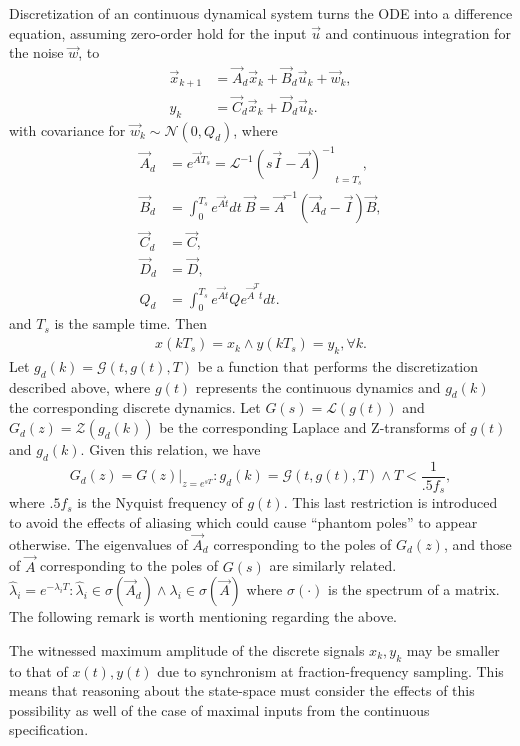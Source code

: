 \documentclass[runningheads,a4paper]{llncs}
\begin{document}
Discretization of an continuous dynamical system turns the ODE into a difference equation, assuming zero-order hold
for the input $\vec{u}$ and continuous integration for the noise $\vec{w}$, to
\begin{align}
\label{eq:discretization}
\vec{x}_{k+1} &= \vec{A}_d\vec{x}_k+\vec{B}_d\vec{u}_k + \vec{w}_k,\\
y_k &= \vec{C}_d \vec{x}_ k + \vec{D}_d \vec{u}_ k. 
\end{align}
with covariance for $\vec{w}_k \sim \mathcal{N}(0,Q_d)$,
where
\begin{align}
\label{eq:discretize}
\vec{A}_d &= e^{\vec{A} T_s} = \mathcal{L}^{-1} { ( s \vec{I} - \vec{A} )^{-1} }_{t = T_s},\\
\vec{B}_d &= \int_{0}^{T_s} e^{\vec{A} t} dt\ \vec{B} = \vec{A}^{-1} ( \vec{A}_d - \vec{I} ) \vec{B},\\
\vec{C}_d &= \vec{C},\\
\vec{D}_d &= \vec{D},\\
Q_d &= \int_{0}^{T_s} e^{\vec{A} t} Q e^{\vec{A}^T t} dt.
\end{align}
and $T_s$ is the sample time. Then
\begin{align*}
x(kT_s)=x_k \wedge y(kT_s) = y_k, \forall k.
\end{align*}
Let $g_d(k)=\mathcal{G}(t,g(t),T)$ be a function that performs the discretization described above, where $g(t)$
represents the continuous dynamics and $g_d(k)$ the corresponding discrete dynamics. 
Let $G(s)=\mathcal{L}(g(t))$ and $G_d(z)=\mathcal{Z}(g_d(k))$ be the corresponding Laplace and Z-transforms
of $g(t)$ and $g_d(k)$. Given this relation, we have 
$$G_d(z)=G(z)|_{z=e^{sT}} : g_d(k)=\mathcal{G}(t,g(t),T) \wedge T < \frac{1}{.5f_s},$$
where $.5f_s$ is the Nyquist frequency of $g(t)$. This last restriction is introduced to avoid the effects of aliasing
which could cause ``phantom poles'' to appear otherwise. 
The eigenvalues of $\vec{A}_d$ corresponding to the poles of $G_d(z)$, and those of $\vec{A}$ corresponding to the poles of $G(s)$ are similarly related.
$\hat{\lambda}_i=e^{-\lambda_iT} : \hat{\lambda}_i \in \sigma(\vec{A}_d) \wedge \lambda_i \in \sigma(\vec{A})$
where $\sigma(\cdot)$ is the spectrum of a matrix.
The following remark is worth mentioning regarding the above.
\begin{remark}
The witnessed maximum amplitude of the discrete signals $x_k,y_k$ may be smaller to that of $x(t),y(t)$ due to synchronism at fraction-frequency sampling.
This means that reasoning about the state-space must consider the effects of this possibility as well of the case of maximal inputs from the continuous specification.
\end{remark}
\end{document}
